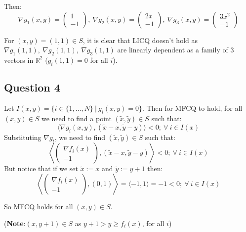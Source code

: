\documentclass[12p]{article}
\begin{document}
Then:
\[
  \nabla g_1(x,y)=\begin{pmatrix}
    1\\
     -1
    \end{pmatrix},\ \nabla g_2(x,y)=\begin{pmatrix}
    2x\\
     -1
    \end{pmatrix},\ \nabla g_3(x,y)=\begin{pmatrix}
    3x^2\\
     -1
    \end{pmatrix}
\]

For \((x,y)=(1,1)\in S\), it is clear that LICQ doesn't hold as \(\nabla g_1(1,1),\ \nabla g_2(1,1),\ \nabla g_3(1,1)\) are linearly dependent as a family of 3 vectors in \(\mathbb{R}^2\) (\(g_i(1,1)=0\) for all \(i\)).

\subsection*{Question 4}\hfil\par
Let \(I(x,y)=\{i\in\{1,\dots ,N\}\ |\ g_i(x,y)=0\}\). Then for MFCQ to hold, for all \((x,y)\in S\) we need to find a point \((\tilde x, \tilde y)\in S\) such that:
\[
  \langle \nabla g_i(x,  y), (\tilde x- x, \tilde y-y)\rangle<0;\ \forall\ i\in I(x)
\]
Substituting \(\nabla g_i\), we need to find \((\tilde x, \tilde y)\in S\) such that:
\[
    \left\langle \begin{pmatrix}
        \nabla f_i(x)\\
         -1
        \end{pmatrix}    , (\tilde x- x, \tilde y-y)\right\rangle<0;\ \forall\ i\in I(x)
\]
But notice that if we set \(\tilde x:=x\) and \(\tilde y:=y+1\) then:
\[
    \left\langle \begin{pmatrix}
        \nabla f_i(x)\\
         -1
        \end{pmatrix}    , (0, 1)\right\rangle=\langle-1,1\rangle=-1<0;\ \forall\ i\in I(x)
\]

So MFCQ holds for all \((x,y)\in S\).

(\textbf{Note}:\((x,y+1)\in S\) as \(y+1>y\geq f_i(x)\), for all \(i\))
\end{document}
